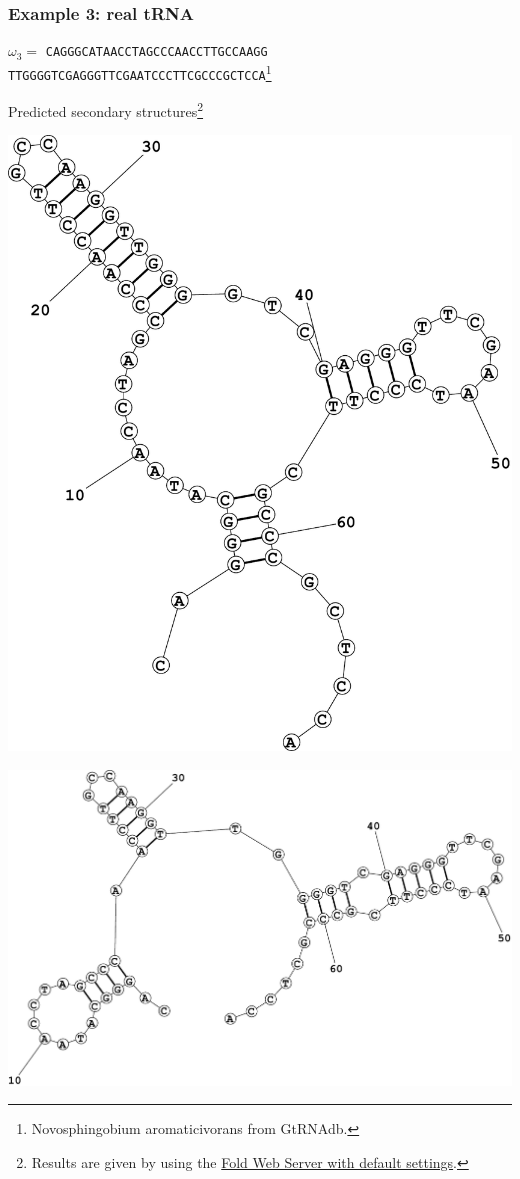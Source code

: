 \documentclass[xcolor=table]{beamer}
\begin{document}
\begin{frame}[fragile]
  \frametitle{Example 3: real tRNA}
\centering
 $\omega_3=$ \texttt{CAGGGCATAACCTAGCCCAACCTTGCCAAGG\\TTGGGGTCGAGGGTTCGAATCCCTTCGCCCGCTCCA}\footnote{\tiny{Novosphingobium aromaticivorans from GtRNAdb.}}
\vspace{0.5cm}

Predicted secondary structures\footnote{\tiny{Results are given by using the \href{http://rna.urmc.rochester.edu/RNAstructureWeb/Servers/Fold/Fold.html}{Fold Web Server with default settings}.}}

\begin{minipage}[t]{0.49\textwidth}
\centering
\includegraphics[width=.70\textwidth]{pictures/Fold1.pdf}
\end{minipage}
\begin{minipage}[t]{0.49\textwidth}
\centering
\includegraphics[width=.96\textwidth]{pictures/Fold2.pdf}
\end{minipage}

\end{frame}
\end{document}
